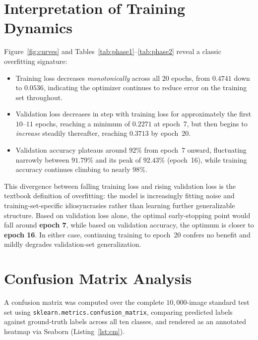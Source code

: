 \documentclass[12pt,a4paper]{report}
\begin{document}
\section{Interpretation of Training Dynamics}
Figure~\ref{fig:curves} and Tables~\ref{tab:phase1}--\ref{tab:phase2} reveal a classic overfitting signature:

\begin{itemize}
    \item Training loss decreases \emph{monotonically} across all 20 epochs, from $0.4741$ down to $0.0536$, indicating the optimizer continues to reduce error on the training set throughout.
    \item Validation loss decreases in step with training loss for approximately the first $10$--$11$ epochs, reaching a minimum of $0.2271$ at epoch~7, but then begins to \emph{increase} steadily thereafter, reaching $0.3713$ by epoch~20.
    \item Validation accuracy plateaus around $92\%$ from epoch~7 onward, fluctuating narrowly between $91.79\%$ and its peak of $92.43\%$ (epoch~16), while training accuracy continues climbing to nearly $98\%$.
\end{itemize}

This divergence between falling training loss and rising validation loss is the textbook definition of overfitting: the model is increasingly fitting noise and training-set-specific idiosyncrasies rather than learning further generalizable structure. Based on validation loss alone, the optimal early-stopping point would fall around \textbf{epoch 7}, while based on validation accuracy, the optimum is closer to \textbf{epoch 16}. In either case, continuing training to epoch~20 confers no benefit and mildly degrades validation-set generalization.

\section{Confusion Matrix Analysis}
A confusion matrix was computed over the complete $10{,}000$-image standard test set using \texttt{sklearn.metrics.confusion\_matrix}, comparing predicted labels against ground-truth labels across all ten classes, and rendered as an annotated heatmap via Seaborn (Listing~\ref{lst:cm}).
\end{document}
